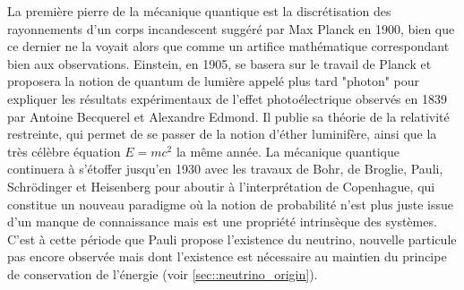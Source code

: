 		    La première pierre de la mécanique quantique est la discrétisation des rayonnements d'un corps incandescent suggéré par Max Planck en 1900\cite{Planck1900}, bien que ce dernier ne la voyait alors que comme un artifice mathématique correspondant bien aux observations. Einstein, en 1905\cite{Einstein1905-quanta}, se basera sur le travail de Planck et proposera la notion de quantum de lumière appelé plus tard "photon" pour expliquer les résultats expérimentaux de l'effet photoélectrique observés en 1839 par Antoine Becquerel et Alexandre Edmond\cite{Becquerel1839}. Il publie sa théorie de la relativité restreinte\cite{Einstein1905-relat}, qui permet de se passer de la notion d'éther luminifère, ainsi que la très célèbre équation $E=mc^2$\cite{Einstein1905-emc2} la même année. La mécanique quantique continuera à s'étoffer jusqu'en 1930 avec les travaux de Bohr, de Broglie, Pauli, Schrödinger et Heisenberg pour aboutir à l'interprétation de Copenhague\cite{Heisenberg1949}, qui constitue un nouveau paradigme où la notion de probabilité n'est plus juste issue d'un manque de connaissance mais est une propriété intrinsèque des systèmes. C'est à cette période que Pauli propose l'existence du neutrino\cite{Pauli1930}, nouvelle particule pas encore observée mais dont l'existence est nécessaire au maintien du principe de conservation de l'énergie (voir \autoref{sec::neutrino_origin}).
		    
